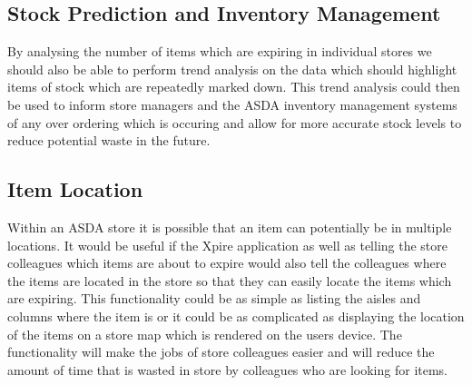 \documentclass[a4paper,11pt]{report}
\begin{document}
\subsection{Stock Prediction and Inventory Management}

By analysing the number of items which are expiring in individual stores we should also be able to perform trend 
analysis on the data which should highlight items of stock which are repeatedly marked down. This trend analysis 
could then be used to inform store managers and the ASDA inventory management systems of any over ordering which is 
occuring and allow for more accurate stock levels to reduce potential waste in the future.

\subsection{Item Location}
Within an ASDA store it is possible that an item can potentially be in multiple locations. It would be useful if the Xpire application as well as telling the store colleagues which items are about to expire would also tell the colleagues where the items are located in the store so that they can easily locate the items which are expiring. 
This functionality could be as simple as listing the aisles and columns where the item is or it could be as complicated as displaying the location of the items on a store map which is rendered on the users device. The functionality will make the jobs of store colleagues easier and will reduce the amount of time that is wasted in store by colleagues who are looking for items. 





\end{document}

